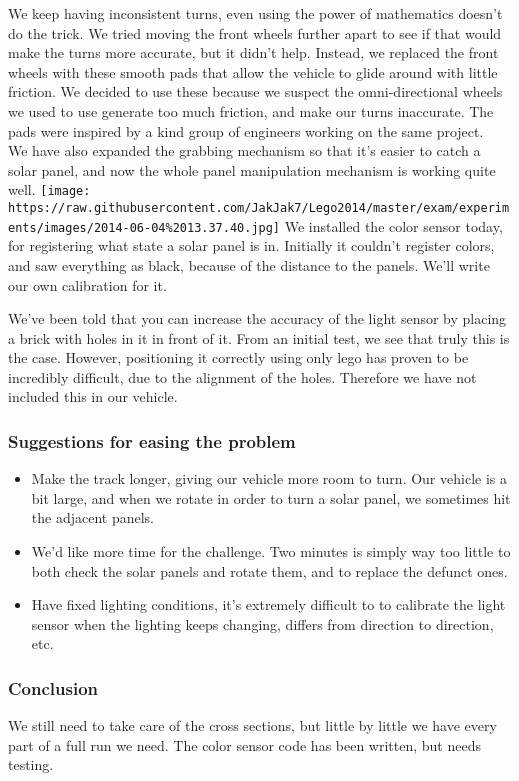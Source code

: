 We keep having inconsistent turns, even using the power of mathematics
doesn't do the trick. We tried moving the front wheels further apart to
see if that would make the turns more accurate, but it didn't help.
Instead, we replaced the front wheels with these smooth pads that allow
the vehicle to glide around with little friction. We decided to use
these because we suspect the omni-directional wheels we used to use
generate too much friction, and make our turns inaccurate. The pads were
inspired by a kind group of engineers working on the same project.\\We
have also expanded the grabbing mechanism so that it's easier to catch a
solar panel, and now the whole panel manipulation mechanism is working
quite well.
\texttt{[image: https://raw.githubusercontent.com/JakJak7/Lego2014/master/exam/experiments/images/2014-06-04\%2013.37.40.jpg]}
We installed the color sensor today, for registering what state a solar
panel is in. Initially it couldn't register colors, and saw everything
as black, because of the distance to the panels. We'll write our own
calibration for it.

We've been told that you can increase the accuracy of the light sensor
by placing a brick with holes in it in front of it. From an initial
test, we see that truly this is the case. However, positioning it
correctly using only lego has proven to be incredibly difficult, due to
the alignment of the holes. Therefore we have not included this in our
vehicle.

\subsubsection{Suggestions for easing the problem}

\begin{itemize}
\itemsep1pt\parskip0pt
\item
  Make the track longer, giving our vehicle more room to turn. Our
  vehicle is a bit large, and when we rotate in order to turn a solar
  panel, we sometimes hit the adjacent panels.
\item
  We'd like more time for the challenge. Two minutes is simply way too
  little to both check the solar panels and rotate them, and to replace
  the defunct ones.
\item
  Have fixed lighting conditions, it's extremely difficult to to
  calibrate the light sensor when the lighting keeps changing, differs
  from direction to direction, etc.
\end{itemize}

\subsubsection{Conclusion}

We still need to take care of the cross sections, but little by little
we have every part of a full run we need. The color sensor code has been
written, but needs testing.
